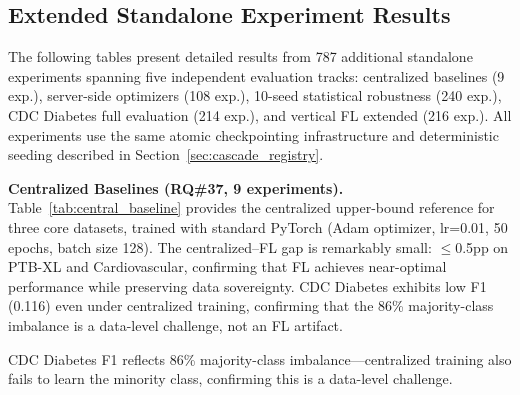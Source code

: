 \documentclass[conference]{IEEEtran}
\begin{document}
\subsection{Extended Standalone Experiment Results}
\label{sec:extended_standalone}

The following tables present detailed results from 787 additional standalone experiments spanning five independent evaluation tracks: centralized baselines (9 exp.), server-side optimizers (108 exp.), 10-seed statistical robustness (240 exp.), CDC Diabetes full evaluation (214 exp.), and vertical FL extended (216 exp.). All experiments use the same atomic checkpointing infrastructure and deterministic seeding described in Section~\ref{sec:cascade_registry}.

\smallskip\noindent\textbf{Centralized Baselines (RQ\#37, 9 experiments).}
Table~\ref{tab:central_baseline} provides the centralized upper-bound reference for three core datasets, trained with standard PyTorch (Adam optimizer, lr=0.01, 50 epochs, batch size 128). The centralized--FL gap is remarkably small: $\leq$0.5pp on PTB-XL and Cardiovascular, confirming that FL achieves near-optimal performance while preserving data sovereignty. CDC Diabetes exhibits low F1 (0.116) even under centralized training, confirming that the 86\% majority-class imbalance is a data-level challenge, not an FL artifact.

\begin{table}[htbp]
\centering
\caption{Centralized Training Baselines (Upper-Bound Reference). Mean $\pm$ std over 3 seeds (42, 123, 456). Adam optimizer, lr=0.01, 50 epochs.}
\label{tab:central_baseline}
\par{\footnotesize CDC Diabetes F1 reflects 86\% majority-class imbalance---centralized training also fails to learn the minority class, confirming this is a data-level challenge.}
\end{table}
\end{document}
